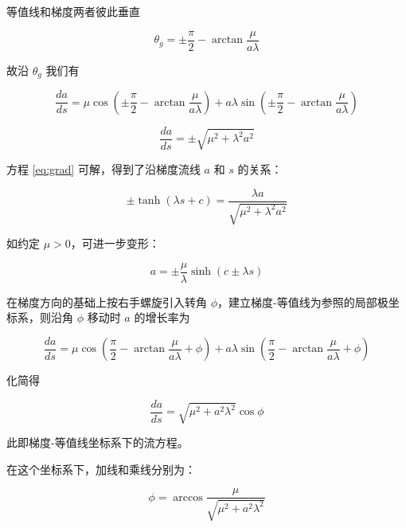 \documentclass[a4paper,12pt]{article}
\numberwithin{problem}{section}
\numberwithin{definition}{section}
\numberwithin{lemma}{section}
\numberwithin{proposition}{section}
\numberwithin{theorem}{section}
\numberwithin{grammar}{section}
\numberwithin{program}{section}
\numberwithin{convention}{section}
\numberwithin{corollary}{section}
\begin{document}
等值线和梯度两者彼此垂直

\begin{equation}
    \theta_g = \pm \frac{\pi}{2} - \arctan \frac{\mu}{a \lambda}
\end{equation}

故沿 $\theta_g$ 我们有

\begin{equation}
    \frac{da}{ds} = \mu \cos (\pm \frac{\pi}{2} - \arctan \frac{\mu}{a \lambda}) + a \lambda \sin (\pm \frac{\pi}{2} - \arctan \frac{\mu}{a \lambda})
\end{equation}

\begin{equation}
    \frac{da}{ds} = \pm \sqrt{\mu^2 + \lambda^2 a^2}\label{eq:grad}
\end{equation}

方程 \eqref{eq:grad} 可解，得到了沿梯度流线 $a$ 和 $s$ 的关系：

\begin{equation}
    \pm \tanh(\lambda s + c) = \frac{\lambda a}{\sqrt{\mu^2 + \lambda^2 a^2}}
\end{equation}

如约定 $\mu > 0$，可进一步变形：

\begin{equation}
  a = \pm \frac{\mu}{\lambda} \sinh(c \pm \lambda s)\label{eq:gradevo}
\end{equation}

在梯度方向的基础上按右手螺旋引入转角 $\phi$，建立梯度-等值线为参照的局部极坐标系，则沿角 $\phi$ 移动时 $a$ 的增长率为

\begin{equation}
    \frac{da}{ds} = \mu \cos (\frac{\pi}{2} - \arctan \frac{\mu}{a \lambda} + \phi) + a \lambda \sin (\frac{\pi}{2} - \arctan \frac{\mu}{a \lambda} + \phi)
    \label{eq:fourfold}
\end{equation}

化简得

\begin{equation}
    \frac{da}{ds} = \sqrt {\mu^2 + a^2 \lambda^2} \cos \phi\label{eq:contourgradient}
\end{equation}

此即梯度-等值线坐标系下的流方程。

在这个坐标系下，加线和乘线分别为：

\begin{equation}
    \phi = \arccos \frac{\mu}{\sqrt {\mu^2 + a^2 \lambda^2}} \label{eq:additionalline}
\end{equation}
\end{document}
